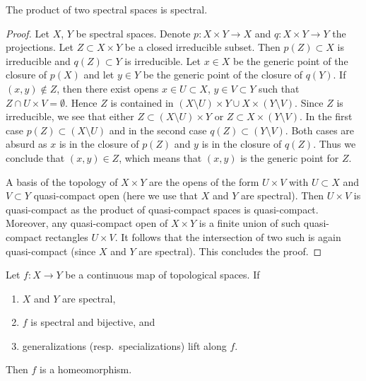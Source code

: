 \begin{lemma}
\label{lemma-product-spectral-spaces}
The product of two spectral spaces is spectral.
\end{lemma}

\begin{proof}
Let $X$, $Y$ be spectral spaces. Denote $p : X \times Y \to X$ and
$q : X \times Y \to Y$ the projections. Let $Z \subset X \times Y$ be a
closed irreducible subset. Then $p(Z) \subset X$ is irreducible
and $q(Z) \subset Y$ is irreducible. Let $x \in X$ be the generic
point of the closure of $p(X)$ and let $y \in Y$ be the generic
point of the closure of $q(Y)$. If $(x, y) \not \in Z$, then
there exist opens $x \in U \subset X$, $y \in V \subset Y$ such
that $Z \cap U \times V = \emptyset$. Hence $Z$ is contained
in $(X \setminus U) \times Y \cup X \times (Y \setminus V)$.
Since $Z$ is irreducible, we see that either
$Z \subset (X \setminus U) \times Y$ or $Z \subset X \times (Y \setminus V)$.
In the first case $p(Z) \subset (X \setminus U)$ and in the
second case $q(Z) \subset (Y \setminus V)$. Both cases are absurd
as $x$ is in the closure of $p(Z)$ and $y$ is in the closure of
$q(Z)$. Thus we conclude that $(x, y) \in Z$, which means that
$(x, y)$ is the generic point for $Z$.

\medskip\noindent
A basis of the topology of $X \times Y$ are the opens of the form
$U \times V$ with $U \subset X$ and $V \subset Y$ quasi-compact open
(here we use that $X$ and $Y$ are spectral). Then $U \times V$ is
quasi-compact as the product of quasi-compact spaces is quasi-compact.
Moreover, any quasi-compact open of $X \times Y$ is a finite union
of such quasi-compact rectangles $U \times V$. It follows that
the intersection of two such is again quasi-compact
(since $X$ and $Y$ are spectral). This concludes the proof.
\end{proof}

\begin{lemma}
\label{lemma-spectral-bijective}
Let $f : X \to Y$ be a continuous map of topological spaces. If
\begin{enumerate}
\item $X$ and $Y$ are spectral,
\item $f$ is spectral and bijective, and
\item generalizations (resp.\ specializations) lift along $f$.
\end{enumerate}
Then $f$ is a homeomorphism.
\end{lemma}


